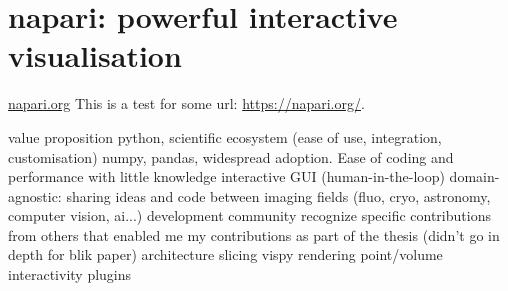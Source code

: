\chapter{napari: powerful interactive visualisation}

\href{https://napari.org/}{napari.org}
This is a test for some url: \url{https://napari.org/}.

\begin{outline}
\1 value proposition
    \2 python, scientific ecosystem (ease of use, integration, customisation)
    \2 numpy, pandas, widespread adoption. Ease of coding and performance with little knowledge
    \2 interactive GUI (human-in-the-loop)
    \2 domain-agnostic: sharing ideas and code between imaging fields (fluo, cryo, astronomy, computer vision, ai...)
\1 development
    \2 community
        \3 recognize specific contributions from others that enabled me
    \2 my contributions as part of the thesis (didn't go in depth for blik paper)
        \3 architecture
        \3 slicing
        \3 vispy rendering
        \3 point/volume interactivity
        \3 plugins
\end{outline}
